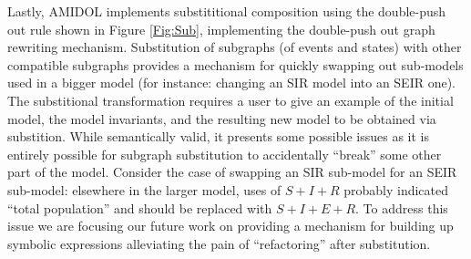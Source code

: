 \documentclass[12pt]{galois-whitepaper}
\begin{document}
Lastly, AMIDOL implements substititional composition using the
double-push out rule shown in Figure \ref{Fig:Sub}, implementing the
double-push out graph rewriting mechanism.  Substitution of subgraphs
(of events and states) with other compatible subgraphs
provides a mechanism for quickly swapping out sub-models used in a
bigger model (for instance: changing an SIR model into an SEIR one).
The substitional transformation requires a user to give an example of
the initial model, the model invariants, and the resulting new model
to be obtained via substition.  While semantically valid, it presents
some possible issues as it is entirely possible for subgraph
substitution to accidentally “break” some other part of the
model. Consider the case of swapping an SIR sub-model for an SEIR
sub-model: elsewhere in the larger model, uses of $S + I + R$ probably
indicated “total population” and should be replaced with $S + I + E +
R$.  To address this issue we are focusing our future work on
providing a mechanism for building up symbolic expressions
alleviating the pain of “refactoring” after
substitution.
\end{document}
